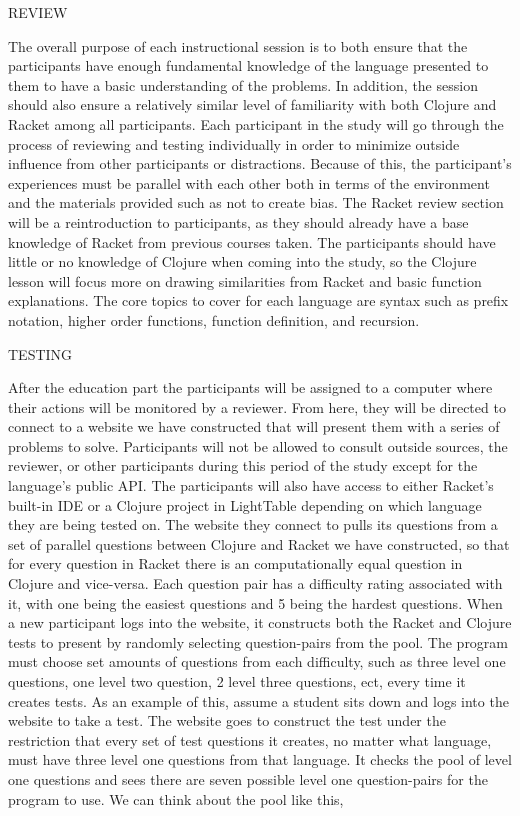\documentclass[12pt]{article}
\begin{document}
REVIEW

The overall purpose of each instructional session is to both ensure that the participants have enough fundamental knowledge of the language presented to them to have a basic understanding of the problems. 
In addition, the session should also ensure a relatively similar level of familiarity with both Clojure and Racket among all participants. 
Each participant in the study will go through the process of reviewing and testing individually in order to minimize outside influence from other participants or distractions. 
Because of this, the participant's experiences must be parallel with each other both in terms of the environment and the materials provided such as not to create bias.
The Racket review section will be a reintroduction to participants, as they should already have a base knowledge of Racket from previous courses taken.
The participants should have little or no knowledge of Clojure when coming into the study, so the Clojure lesson will focus more on drawing similarities from Racket and basic function explanations.
The core topics to cover for each language are syntax such as prefix notation, higher order functions, function definition, and recursion.

TESTING

After the education part the participants will be assigned to a computer where their actions will be monitored by a reviewer. 
From here, they will be directed to connect to a website we have constructed that will present them with a series of problems to solve. 
Participants will not be allowed to consult outside sources, the reviewer, or other participants during this period of the study except for the language's public API. 
The participants will also have access to either Racket's built-in IDE or a Clojure project in LightTable depending on which language they are being tested on.
The website they connect to pulls its questions from a set of parallel questions between Clojure and Racket we have constructed, so that for every question in Racket there is an computationally equal question in Clojure and vice-versa.
Each question pair has a difficulty rating associated with it, with one being the easiest questions and 5 being the hardest questions.
When a new participant logs into the website, it constructs both the Racket and Clojure tests to present by randomly selecting question-pairs from the pool. 
The program must choose set amounts of questions from each difficulty, such as three level one questions, one level two question, 2 level three questions, ect, every time it creates tests. 
As an example of this, assume a student sits down and logs into the website to take a test.
The website goes to construct the test under the restriction that every set of test questions it creates, no matter what language, must have three level one questions from that language. 
It checks the pool of level one questions and sees there are seven possible level one question-pairs for the program to use.
We can think about the pool like this,
\end{document}

